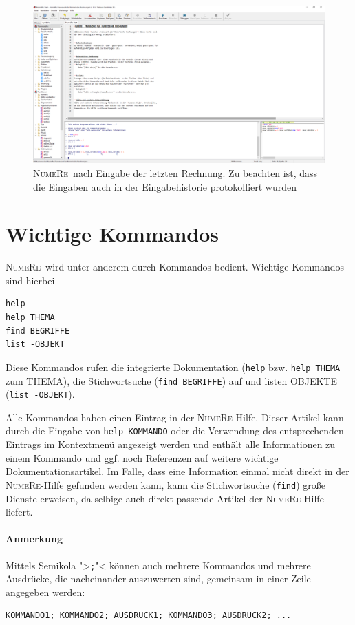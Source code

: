 \documentclass[DIV=14,headsepline,footsepline]{scrbook}
\newcommand{\NR}{\textsc{Nu\-me\-Re}}
\begin{document}
				\begin{figure}[htb]%
					\centering
					\includegraphics[width=\textwidth]{_graphics/first_calc_1.png}
					\caption{\NR\ nach Eingabe der letzten Rechnung. Zu beachten ist, dass die Eingaben auch in der Eingabehistorie protokolliert wurden}
					\label{fig:first_calc_1}
				\end{figure}
			\section{Wichtige Kommandos}
				\NR\ wird unter anderem durch Kommandos bedient. Wichtige Kommandos sind hierbei
					\begin{lstlisting}
help
help THEMA
find BEGRIFFE
list -OBJEKT
					\end{lstlisting}
					Diese Kommandos rufen die integrierte Dokumentation (\lstinline+help+ bzw. \lstinline+help THEMA+ zum THEMA), die Stichwortsuche (\lstinline+find BEGRIFFE+) auf und listen OBJEKTE (\lstinline+list -OBJEKT+).
					
					Alle Kommandos haben einen Eintrag in der \NR-Hilfe. Dieser Artikel kann durch die Eingabe von \lstinline+help KOMMANDO+ oder die Verwendung des entsprechenden Eintrags im Kontextmenü angezeigt werden und enthält alle Informationen zu einem Kommando und ggf. noch Referenzen auf weitere wichtige Dokumentationsartikel. Im Falle, dass eine Information einmal nicht direkt in der \NR-Hilfe gefunden werden kann, kann die Stichwortsuche (\lstinline+find+) große Dienste erweisen, da selbige auch direkt passende Artikel der \NR-Hilfe liefert.
					\paragraph{Anmerkung}
						Mittels Semikola ">\lstinline+;+"< können auch mehrere Kommandos und mehrere Ausdrücke, die nacheinander auszuwerten sind, gemeinsam in einer Zeile angegeben werden:
						\begin{lstlisting}
KOMMANDO1; KOMMANDO2; AUSDRUCK1; KOMMANDO3; AUSDRUCK2; ...
						\end{lstlisting}
\end{document}
